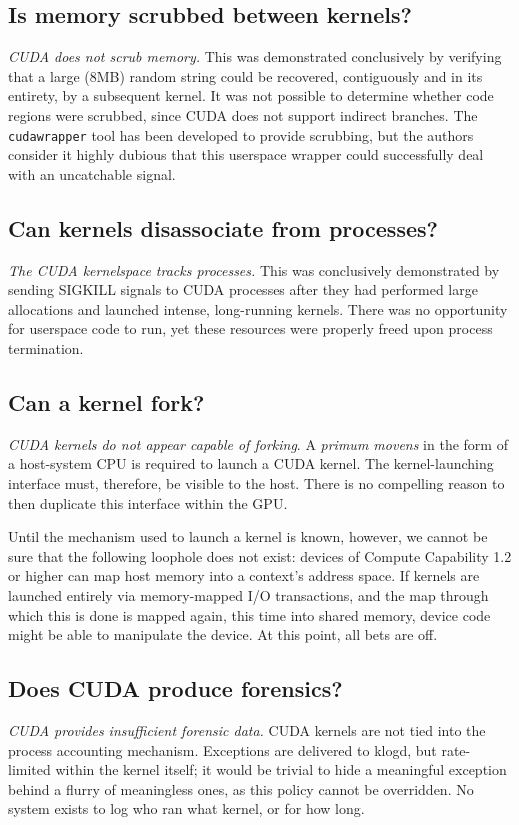 \documentclass[letterpaper,10pt]{article}
\begin{document}
\begin{multicols}{2}
\subsection{Is memory scrubbed between kernels?}
\textit{CUDA does not scrub memory.} This was demonstrated conclusively by
verifying that a large (8MB) random string could be recovered, contiguously and
in its entirety, by a subsequent kernel. It was not possible to determine
whether code regions were scrubbed, since CUDA does not support indirect
branches. The \texttt{cudawrapper}\cite{cudawrapper} tool has been
developed to provide scrubbing, but the authors consider it highly dubious
that this userspace wrapper could successfully deal with an uncatchable signal.
\subsection{Can kernels disassociate from processes?}
\textit{The CUDA kernelspace tracks processes.} This was conclusively
demonstrated by sending SIGKILL signals to CUDA processes after they had
performed large allocations and launched intense, long-running kernels. There
was no opportunity for userspace code to run, yet these resources were properly
freed upon process termination.
\subsection{Can a kernel fork?}
\textit{CUDA kernels do not appear capable of forking}. A \textit{primum movens} in the
form of a host-system CPU is required to launch a CUDA kernel. The kernel-launching
interface must, therefore, be visible to the host. There is no compelling reason to
then duplicate this interface within the GPU.

Until the mechanism used to launch a kernel is known, however, we cannot be sure
that the following loophole does not exist: devices of Compute Capability 1.2 or higher
can map host memory into a context's address space. If kernels are launched
entirely via memory-mapped I/O transactions, and the map through which this is
done is mapped again, this time into shared memory, device code might be able
to manipulate the device. At this point, all bets are off.
\subsection{Does CUDA produce forensics?}
\textit{CUDA provides insufficient forensic data.} CUDA kernels are not tied
into the process accounting mechanism. Exceptions are delivered to klogd, but
rate-limited within the kernel itself; it would be trivial to hide a meaningful
exception behind a flurry of meaningless ones, as this policy cannot be
overridden. No system exists to log who ran what kernel, or for how long.


\end{multicols}
\end{document}
